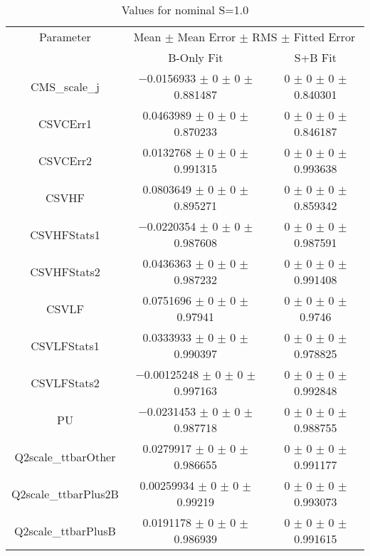 \begin{table}
\centering
\caption{Values for nominal S=1.0}
\begin{tabular}{ccc}
\toprule
Parameter & \multicolumn{2}{c}{Mean $\pm$ Mean Error $\pm$ RMS $\pm$ Fitted Error}\\
 & B-Only Fit & S+B Fit\\
\midrule
CMS\_scale\_j & \num{-0.0156933} $\pm$ \num{0} $\pm$ \num{0} $\pm$ \num{0.881487} & \num{0} $\pm$ \num{0} $\pm$ \num{0} $\pm$ \num{0.840301}\\
CSVCErr1 & \num{0.0463989} $\pm$ \num{0} $\pm$ \num{0} $\pm$ \num{0.870233} & \num{0} $\pm$ \num{0} $\pm$ \num{0} $\pm$ \num{0.846187}\\
CSVCErr2 & \num{0.0132768} $\pm$ \num{0} $\pm$ \num{0} $\pm$ \num{0.991315} & \num{0} $\pm$ \num{0} $\pm$ \num{0} $\pm$ \num{0.993638}\\
CSVHF & \num{0.0803649} $\pm$ \num{0} $\pm$ \num{0} $\pm$ \num{0.895271} & \num{0} $\pm$ \num{0} $\pm$ \num{0} $\pm$ \num{0.859342}\\
CSVHFStats1 & \num{-0.0220354} $\pm$ \num{0} $\pm$ \num{0} $\pm$ \num{0.987608} & \num{0} $\pm$ \num{0} $\pm$ \num{0} $\pm$ \num{0.987591}\\
CSVHFStats2 & \num{0.0436363} $\pm$ \num{0} $\pm$ \num{0} $\pm$ \num{0.987232} & \num{0} $\pm$ \num{0} $\pm$ \num{0} $\pm$ \num{0.991408}\\
CSVLF & \num{0.0751696} $\pm$ \num{0} $\pm$ \num{0} $\pm$ \num{0.97941} & \num{0} $\pm$ \num{0} $\pm$ \num{0} $\pm$ \num{0.9746}\\
CSVLFStats1 & \num{0.0333933} $\pm$ \num{0} $\pm$ \num{0} $\pm$ \num{0.990397} & \num{0} $\pm$ \num{0} $\pm$ \num{0} $\pm$ \num{0.978825}\\
CSVLFStats2 & \num{-0.00125248} $\pm$ \num{0} $\pm$ \num{0} $\pm$ \num{0.997163} & \num{0} $\pm$ \num{0} $\pm$ \num{0} $\pm$ \num{0.992848}\\
PU & \num{-0.0231453} $\pm$ \num{0} $\pm$ \num{0} $\pm$ \num{0.987718} & \num{0} $\pm$ \num{0} $\pm$ \num{0} $\pm$ \num{0.988755}\\
Q2scale\_ttbarOther & \num{0.0279917} $\pm$ \num{0} $\pm$ \num{0} $\pm$ \num{0.986655} & \num{0} $\pm$ \num{0} $\pm$ \num{0} $\pm$ \num{0.991177}\\
Q2scale\_ttbarPlus2B & \num{0.00259934} $\pm$ \num{0} $\pm$ \num{0} $\pm$ \num{0.99219} & \num{0} $\pm$ \num{0} $\pm$ \num{0} $\pm$ \num{0.993073}\\
Q2scale\_ttbarPlusB & \num{0.0191178} $\pm$ \num{0} $\pm$ \num{0} $\pm$ \num{0.986939} & \num{0} $\pm$ \num{0} $\pm$ \num{0} $\pm$ \num{0.991615}\\

\end{tabular}
\end{table}
